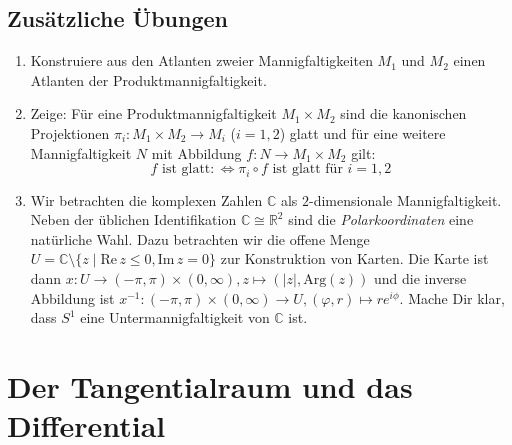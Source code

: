 \documentclass[a4paper,headsepline,headheight=30pt,numbers=enddot]{scrartcl}
\newcommand{\R}{\mathbb{R}}
\begin{document}
	\subsection*{Zusätzliche Übungen}
	\begin{enumerate}
		\item Konstruiere aus den Atlanten zweier Mannigfaltigkeiten $M_1$ und $M_2$ einen Atlanten der Produktmannigfaltigkeit.
		\item Zeige: Für eine Produktmannigfaltigkeit $M_1\times M_2$ sind die kanonischen Projektionen $\pi_i\colon M_1\times M_2\rightarrow M_i$ ($i=1,2$) glatt und für eine weitere Mannigfaltigkeit $N$ mit Abbildung $f\colon N\rightarrow M_1\times M_2$ gilt:
		\begin{equation}
		\text{$f$ ist glatt} \colon\Leftrightarrow \pi_i\circ f \text{ ist glatt für } i=1,2
		\end{equation}
		\item Wir betrachten die komplexen Zahlen $\mathbb{C}$ als $2$-dimensionale Mannigfaltigkeit. Neben der üblichen Identifikation $\mathbb{C}\cong\R^2$ sind die \emph{Polarkoordinaten} eine natürliche Wahl. Dazu betrachten wir die offene Menge $U = \mathbb{C}\setminus\{z\mid \mathrm{Re}\,z\leq 0, \mathrm{Im}\,z=0\}$ zur Konstruktion von Karten.  Die Karte ist dann $x\colon U\rightarrow (-\pi,\pi)\times (0,\infty), z\mapsto (\lvert z\rvert, \mathrm{Arg}(z))$ und die inverse Abbildung ist $x^{-1}\colon (-\pi,\pi)\times (0,\infty)\rightarrow U, (\varphi,r)\mapsto re^{i\phi}$. Mache Dir klar, dass $S^1$ eine Untermannigfaltigkeit von $\mathbb{C}$ ist.
	\end{enumerate}

	\newpage
	\section[Der Tangentialraum]{Der Tangentialraum und das Differential}
\end{document}
